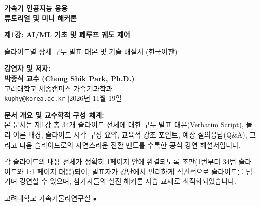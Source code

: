\documentclass[11pt,a4paper]{article}
\begin{document}
\begin{titlepage}
    \centering
    \vspace*{1.2cm}
    {\Huge\bfseries\color{navy}가속기 인공지능 응용\\[0.3em]튜토리얼 및 미니 해커톤\par}
    \vspace{0.8cm}
    {\LARGE\bfseries\color{primaryblue}제1강: AI/ML 기초 및 폐루프 궤도 제어\par}
    \vspace{0.3cm}
    {\Large\color{accent}슬라이드별 상세 구두 발표 대본 및 기술 해설서 (한국어판)\par}
    \vspace{1.2cm}

    \begin{tcolorbox}[colback=white,colframe=accent,width=0.88\textwidth,arc=4pt]
        \centering
        \textbf{강연자 및 저자:}\\[0.2em]
        {\large\bfseries 박종식 교수 (Chong Shik Park, Ph.D.)}\\[0.2em]
        고려대학교 세종캠퍼스 가속기과학과\\[0.2em]
        \texttt{kuphy@korea.ac.kr} \enspace$|$\enspace 2026년 11월 19일
    \end{tcolorbox}

    \vspace{1.2cm}
    \begin{minipage}{0.88\textwidth}
        \small\color{darkgray}
        \textbf{문서 개요 및 교수학적 구성 체계:}\\
        본 문서는 제1강 총 34개 슬라이드 전체에 대한 구두 발표 대본(Verbatim Script), 물리 이론 배경, 슬라이드 시각 구성 요약, 교육적 강조 포인트, 예상 질의응답(Q\&A), 그리고 다음 슬라이드로의 자연스러운 전환 멘트를 수록한 공식 강연 해설서입니다.
        \par\vspace{0.6em}
        각 슬라이드의 내용 전체가 정확히 1페이지 안에 완결되도록 조판(1번부터 34번 슬라이드와 1:1 페이지 대응)되어, 발표자가 강단에서 편리하게 직관적으로 슬라이드를 넘기며 강연할 수 있으며, 참가자들의 실전 해커톤 자습 교재로 최적화되었습니다.
    \end{minipage}
    \vfill
    {\footnotesize\color{darkgray}고려대학교 가속기물리연구실 \enspace$\bullet$}
\end{titlepage}

\clearpage
{}
\end{document}
